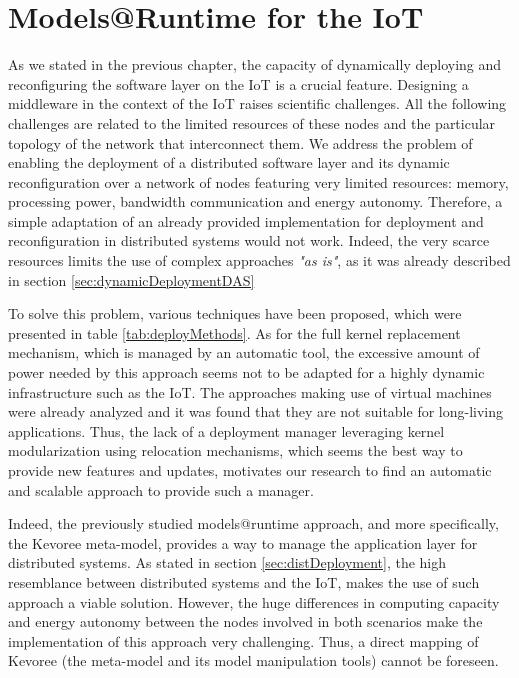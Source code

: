 \chapter{Models@Runtime for the IoT}
\label{ch:MARContiki}

As we stated in the previous chapter, the capacity of dynamically deploying and reconfiguring the software layer on the IoT is a crucial feature.
Designing a middleware in the context of the IoT raises scientific challenges.
All the following challenges are related to the limited resources of these nodes and the particular topology of the network that interconnect them.
We address the problem of enabling the deployment of a distributed software layer and its dynamic reconfiguration over a network of nodes featuring very limited resources: memory, processing power, bandwidth communication and energy autonomy.
Therefore, a simple adaptation of an already provided implementation for deployment and reconfiguration in distributed systems would not work.
Indeed, the very scarce resources limits the use of complex approaches \textit{"as is"}, as it was already described in section \ref{sec:dynamicDeploymentDAS}

To solve this problem, various techniques have been proposed, which were presented in table \ref{tab:deployMethods}. 
As for the full kernel replacement mechanism, which is managed by an automatic tool\cite{hui2004dynamic}, the excessive amount of power needed by this approach seems not to be adapted for a highly dynamic infrastructure such as the IoT.
The approaches making use of virtual machines were already analyzed and it was found that they are not suitable for long-living applications\cite{oliver2014reprogramming}.
Thus, the lack of a deployment manager leveraging kernel modularization using relocation mechanisms, which seems the best way to provide new features and updates, motivates our research to find an automatic and scalable approach to provide such a manager.

Indeed, the previously studied models@runtime approach, and more specifically, the Kevoree meta-model, provides a way to manage the application layer for distributed systems.
As stated in section \ref{sec:distDeployment}, the high resemblance between distributed systems and the IoT, makes the use of such approach a viable solution.
However, the huge differences in computing capacity and energy autonomy between the nodes involved in both scenarios make the implementation of this approach very challenging.
Thus, a direct mapping of Kevoree (the meta-model and its model manipulation tools) cannot be foreseen.

